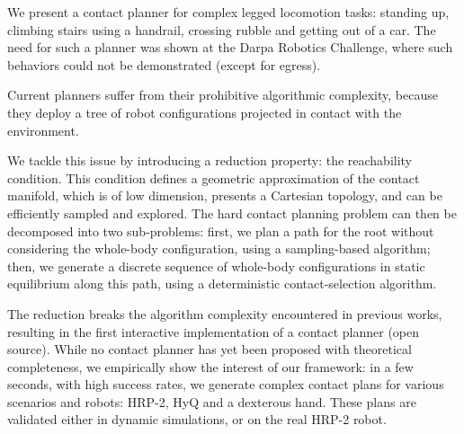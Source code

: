 We present a contact planner for complex legged locomotion tasks: standing up, climbing stairs using a handrail, crossing rubble and getting out of a car. The need for such a planner was shown at the Darpa Robotics Challenge, where such behaviors
could not be demonstrated (except for egress).

Current planners suffer from their prohibitive algorithmic complexity, because they deploy a tree of robot
configurations projected in contact with the environment.

We tackle this issue by introducing a reduction property: the reachability condition. This condition defines
a geometric approximation of the contact manifold, which is of low dimension, presents a Cartesian topology, and can be efficiently sampled and explored.
The hard contact planning problem can then be decomposed into two
sub-problems: first, we plan a path for the root without considering the whole-body configuration, using a sampling-based algorithm; then, we generate a discrete sequence of whole-body configurations in static equilibrium along this path, using a deterministic contact-selection algorithm. 

The reduction breaks the algorithm complexity encountered
in previous works, resulting in the first interactive
implementation of a contact planner (open source). While
no contact planner has yet been proposed with theoretical
completeness, we empirically show the interest of our framework:
in a
few seconds, with high success rates, we generate complex contact plans for various scenarios and robots: HRP-2, HyQ and a dexterous hand. These plans are validated either in dynamic simulations, or on the real HRP-2 robot.

